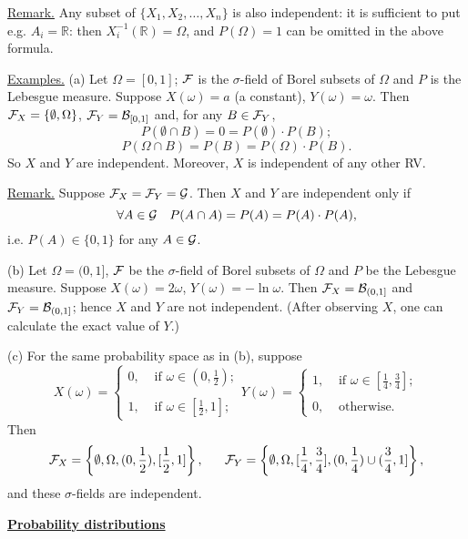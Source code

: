 \documentclass[a4paper,10pt]{article}
\def\RR{\mathbb{R}}
\newcommand{\1}[1]{\mathbf{1}_{\{#1\}}}
\begin{document}
\underline{Remark.} Any subset of $\{X_1,X_2,\ldots, X_n\}$ is also independent: it is sufficient to put e.g. $A_i=\RR$: then $X^{-1}_i(\RR)=\Omega$, and $P(\Omega)=1$ can be omitted in the above formula. \vspace{3mm}

\underline{Examples.} (a) Let $\Omega=[0,1]$; $\cal F$ is the $\sigma$-field of Borel subsets of $\Omega$ and $P$ is the Lebesgue measure. Suppose $X(\omega)=a$ (a constant), $Y(\omega)=\omega$. Then ${\cal F}_X=\{\emptyset,\Omega\}$, ${\cal F}_Y={\cal B}_{[0,1]}$ and, for any $B\in{\cal F}_Y$,
  $$P(\emptyset\cap B)=0=P(\emptyset)\cdot P(B);$$
  $$P(\Omega\cap B)=P(B)=P(\Omega)\cdot P(B).$$
So $X$ and $Y$ are independent. Moreover, $X$ is independent of any other RV.
\vspace{3mm}

\underline{Remark.} Suppose ${\cal F}_X={\cal F}_Y={\cal G}$. Then $X$ and $Y$ are independent only if
  $$\forall A\in{\cal G}~~~P(A\cap A)=P(A)=P(A)\cdot P(A),$$
i.e. $P(A)\in\{0,1\}$ for any $A\in{\cal G}$.
\vspace{3mm}

(b) Let $\Omega=(0,1]$, $\cal F$ be the $\sigma$-field of Borel subsets of $\Omega$ and $P$ be the Lebesgue measure. Suppose $X(\omega)=2\omega$, $Y(\omega)=-\ln \omega$. Then ${\cal F}_X={\cal B}_{(0,1]}$ and ${\cal F}_Y={\cal B}_{(0,1]}$; hence $X$ and $Y$ are not independent. (After observing $X$, one can calculate the exact value of $Y$.)

(c) For the same probability space as in (b), suppose
  $$X(\omega)=\left\{\begin{array}{ll}
0, & \mbox{ if } \omega\in(0,\frac{1}{2}); \\ \\ 1, & \mbox{ if } \omega\in[\frac{1}{2},1]; \end{array}\right.
Y(\omega)=\left\{\begin{array}{ll}
1, & \mbox{ if } \omega\in[\frac{1}{4},\frac{3}{4}]; \\ \\ 0, & \mbox{ otherwise. } \end{array}\right.$$
Then
  $${\cal F}_X=\left\{\emptyset,\Omega,(0,\frac{1}{2}), [\frac{1}{2},1]\right\},~~~~~{\cal F}_Y=\left\{\emptyset,\Omega,[\frac{1}{4},\frac{3}{4}], (0,\frac{1}{4})\cup(\frac{3}{4},1]\right\},$$
and these $\sigma$-fields are independent. \vspace{3mm}

\begin{center}\bf\underline{Probability distributions} \end{center}\vspace{3mm}
\end{document}
